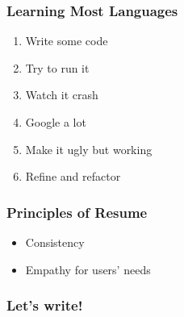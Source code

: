 \documentclass{beamer}
\begin{document}
\begin{frame}
 \frametitle{Learning Most Languages}



\begin{enumerate}
  \item Write some code
  \item Try to run it
  \item Watch it crash
  \item Google a lot
  \item Make it ugly but working
  \item Refine and refactor
\end{enumerate}


\end{frame}
\begin{frame}
 \frametitle{Principles of Resume}



\begin{itemize}
  \item Consistency
  \item Empathy for users' needs
\end{itemize}


\end{frame}
\begin{frame}
 \frametitle{Let's write!}




\end{frame}
\end{document}
